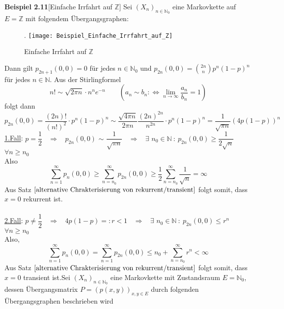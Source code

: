 \textbf{Beispiel 2.11}[Einfache Irrfahrt auf $\mathbb{Z}$]
Sei $(X_{n})_{n \in \mathbb{N}_{0}}$ eine Markovkette auf $E=\mathbb{Z}$ mit folgendem Übergangsgraphen:
\begin{figure}[H].
\centering
\texttt{[image: Beispiel\_Einfache\_Irrfahrt\_auf\_Z]}
\caption{Einfache Irrfahrt auf $\mathbb{Z}$}
\end{figure}
\noindent
Dann gilt $p_{2n+1}(0,0) = 0$ für jedes $n \in \mathbb{N}_{0}$ und $p_{2n}(0,0) = \binom{2n}{n} p^{n} (1-p)^{n}$ für jedes $n \in \mathbb{N}$. Aus der Stirlingformel
\begin{equation*}
n! \sim \sqrt{2 \pi n} \cdot n^{n} e^{-n} \qquad (a_{n} \sim b_{n} :\Leftrightarrow \lim_{n \to \infty} \dfrac{a_{n}}{b_{n}} = 1)
\end{equation*}
folgt dann
\begin{equation*}
p_{2n}(0,0) = \dfrac{(2n)!}{(n!)^{2}} \cdot p^{n}(1-p)^{n} \sim \dfrac{\sqrt{4 \pi n}}{2 \pi n} \dfrac{(2n)^{2n}}{n^{2n}} \cdot p^{n} (1-p)^{n} = \dfrac{1}{\sqrt{\pi n}} (4p(1-p))^{n}
\end{equation*}
\underline{1.Fall}: $p=\dfrac{1}{2}$ $\:$  $\Rightarrow$ $\:$  $p_{2n}(0,0)$ $\sim$ $\dfrac{1}{\sqrt{\pi n}}$ $\:$  $\Rightarrow$ $\:$ $\exists$ $n_{0} \in \mathbb{N} \: : \: p_{2n}(0,0) \geq \dfrac{1}{2\sqrt{n}}$ $\:$  $\forall n \geq n_{0}$
\\
Also
\begin{equation*}
\sum_{n=1}^{\infty} p_{n}(0,0) \geq \sum_{n=n_{0}}^{\infty}p_{2n}(0,0) \geq \dfrac{1}{2} \sum_{n=n_{0}}^{\infty}\dfrac{1}{\sqrt{n}} = \infty
\end{equation*}
Aus Satz $\ref{alternative Chrakterisierung von rekurrent/transient}$ folgt somit, dass $x=0$ rekurrent ist.
\\
\\
\underline{2.Fall}: $p \neq \dfrac{1}{2}$ $\:$  $\Rightarrow$ $\:$ $4p(1-p) =: r < 1$ $\:$  $\Rightarrow$ $\:$ $\exists$ $n_{0} \in \mathbb{N} \: : \: p_{2n}(0,0) \leq r^{n}$ $\:$  $\forall n \geq n_{0}$
\\
Also,
\begin{equation*}
\sum_{n=1}^{\infty} p_{n}(0,0) = \sum_{n=1}^{\infty} p_{2n}(0,0) \leq n_{0} + \sum_{n=n_{0}}^{\infty} r^{n} < \infty
\end{equation*}
Aus Satz $\ref{alternative Chrakterisierung von rekurrent/transient}$ folgt somit, dass $x=0$ transient ist.Sei $(X_{n})_{n \in \mathbb{N}_{0}}$ eine Markovkette mit Zustandsraum $E = \mathbb{N}_{0}$, dessen Übergangsmatrix $P = (p(x,y))_{x,y \in E}$ durch folgenden Übergangsgraphen beschrieben wird
